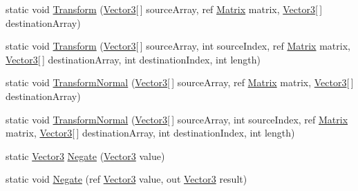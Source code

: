 \begin{DoxyCompactItemize}
\item 
static void \hyperlink{struct_microsoft_1_1_xna_1_1_framework_1_1_vector3_a96f8c9d59c99170619a1a0c68ea3e904}{Transform} (\hyperlink{struct_microsoft_1_1_xna_1_1_framework_1_1_vector3}{Vector3}\mbox{[}$\,$\mbox{]} source\+Array, ref \hyperlink{struct_microsoft_1_1_xna_1_1_framework_1_1_matrix}{Matrix} matrix, \hyperlink{struct_microsoft_1_1_xna_1_1_framework_1_1_vector3}{Vector3}\mbox{[}$\,$\mbox{]} destination\+Array)
\item 
static void \hyperlink{struct_microsoft_1_1_xna_1_1_framework_1_1_vector3_a2bd5e46992bdb6b201a6afc3edd83e85}{Transform} (\hyperlink{struct_microsoft_1_1_xna_1_1_framework_1_1_vector3}{Vector3}\mbox{[}$\,$\mbox{]} source\+Array, int source\+Index, ref \hyperlink{struct_microsoft_1_1_xna_1_1_framework_1_1_matrix}{Matrix} matrix, \hyperlink{struct_microsoft_1_1_xna_1_1_framework_1_1_vector3}{Vector3}\mbox{[}$\,$\mbox{]} destination\+Array, int destination\+Index, int length)
\item 
static void \hyperlink{struct_microsoft_1_1_xna_1_1_framework_1_1_vector3_a76fde48c6f23906dc746ddfbb6ca2248}{Transform\+Normal} (\hyperlink{struct_microsoft_1_1_xna_1_1_framework_1_1_vector3}{Vector3}\mbox{[}$\,$\mbox{]} source\+Array, ref \hyperlink{struct_microsoft_1_1_xna_1_1_framework_1_1_matrix}{Matrix} matrix, \hyperlink{struct_microsoft_1_1_xna_1_1_framework_1_1_vector3}{Vector3}\mbox{[}$\,$\mbox{]} destination\+Array)
\item 
static void \hyperlink{struct_microsoft_1_1_xna_1_1_framework_1_1_vector3_aa79ba9e68abb6e065131f99690a13bc0}{Transform\+Normal} (\hyperlink{struct_microsoft_1_1_xna_1_1_framework_1_1_vector3}{Vector3}\mbox{[}$\,$\mbox{]} source\+Array, int source\+Index, ref \hyperlink{struct_microsoft_1_1_xna_1_1_framework_1_1_matrix}{Matrix} matrix, \hyperlink{struct_microsoft_1_1_xna_1_1_framework_1_1_vector3}{Vector3}\mbox{[}$\,$\mbox{]} destination\+Array, int destination\+Index, int length)
\item 
static \hyperlink{struct_microsoft_1_1_xna_1_1_framework_1_1_vector3}{Vector3} \hyperlink{struct_microsoft_1_1_xna_1_1_framework_1_1_vector3_a804d39bf3c74f7672f85c5c6d2f2e81a}{Negate} (\hyperlink{struct_microsoft_1_1_xna_1_1_framework_1_1_vector3}{Vector3} value)
\item 
static void \hyperlink{struct_microsoft_1_1_xna_1_1_framework_1_1_vector3_aa3cd565760e502e9d26680cc0039af07}{Negate} (ref \hyperlink{struct_microsoft_1_1_xna_1_1_framework_1_1_vector3}{Vector3} value, out \hyperlink{struct_microsoft_1_1_xna_1_1_framework_1_1_vector3}{Vector3} result)

\end{DoxyCompactItemize}
